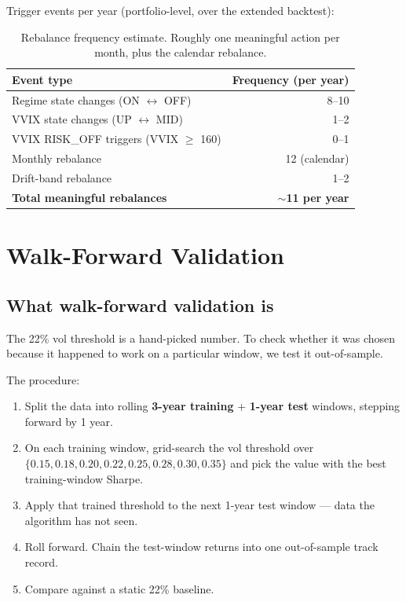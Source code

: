 \documentclass[11pt,a4paper]{article}
\begin{document}
Trigger events per year (portfolio-level, over the extended backtest):

\begin{table}[H]
\centering
\small
\begin{tabular}{lr}
\toprule
\textbf{Event type} & \textbf{Frequency (per year)} \\
\midrule
Regime state changes (ON $\leftrightarrow$ OFF)     & 8--10 \\
VVIX state changes (UP $\leftrightarrow$ MID)       & 1--2 \\
VVIX RISK\_OFF triggers (VVIX $\geq$ 160)           & 0--1 \\
Monthly rebalance                                   & 12 (calendar) \\
Drift-band rebalance                                & 1--2 \\
\midrule
\textbf{Total meaningful rebalances}                & \textbf{$\sim$11 per year} \\
\bottomrule
\end{tabular}
\caption{Rebalance frequency estimate. Roughly one meaningful action per month, plus the calendar rebalance.}
\end{table}

\section{Walk-Forward Validation}

\subsection{What walk-forward validation is}

The 22\% vol threshold is a hand-picked number. To check whether it was chosen because it happened to work on a particular window, we test it out-of-sample.

The procedure:
\begin{enumerate}[noitemsep]
    \item Split the data into rolling \textbf{3-year training} + \textbf{1-year test} windows, stepping forward by 1 year.
    \item On each training window, grid-search the vol threshold over $\{0.15, 0.18, 0.20, 0.22, 0.25, 0.28, 0.30, 0.35\}$ and pick the value with the best training-window Sharpe.
    \item Apply that trained threshold to the next 1-year test window --- data the algorithm has not seen.
    \item Roll forward. Chain the test-window returns into one out-of-sample track record.
    \item Compare against a static 22\% baseline.
\end{enumerate}
\end{document}
